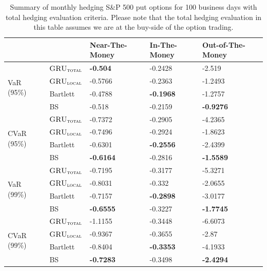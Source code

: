 \documentclass[letterpaper,12pt,titlepage,oneside,final]{book}
\numberwithin{equation}{section}
\theoremstyle{definition}
\newcommand{\modelT}{\textsc{GRU}_{\textsc{total}}}
\newcommand{\modelL}{\textsc{GRU}_{\textsc{local}}}
\begin{document}
\begin{table}[htp!]
	\centering
	\begin{tabular}{ll|l|l|l|}
		\cline{3-5}
		&          & Near-The-Money   & In-The-Money     & Out-of-The-Money  \\ \hline
		\multicolumn{1}{|l|}{\multirow{4}{*}{VaR (95\%)}}     & $\modelT$    &\textbf{-0.504}  &-0.2428 &-2.519           \\  
		\multicolumn{1}{|l|}{}                                & $\modelL$    &-0.5766 &-0.2363 &-1.2493  \\  
		\multicolumn{1}{|l|}{}                                & Bartlett 	 &-0.4788 &\textbf{-0.1968} &-1.2757           \\  
		\multicolumn{1}{|l|}{}                                & BS       	 &-0.518  &-0.2159 &\textbf{-0.9276}           \\ 
		\hline
		\multicolumn{1}{|l|}{\multirow{4}{*}{CVaR (95\%)}}    & $\modelT$    &-0.7372 &-0.2905 &-4.2365 \\  
		\multicolumn{1}{|l|}{}                                & $\modelL$    &-0.7496 &-0.2924 &-1.8623          \\  
		\multicolumn{1}{|l|}{}                                & Bartlett 	 &-0.6301 &\textbf{-0.2556} &-2.4399          \\  
		\multicolumn{1}{|l|}{}                                & BS       	 &\textbf{-0.6164} &-0.2816 &\textbf{-1.5589}          \\ 
		\hline
		\multicolumn{1}{|l|}{\multirow{4}{*}{VaR (99\%)}}     & $\modelT$   &-0.7195 &-0.3177 &-5.3271         \\  
		\multicolumn{1}{|l|}{}                                & $\modelL$   &-0.8031 &-0.332  &-2.0655
		                  \\  
		\multicolumn{1}{|l|}{}                                & Bartlett 	& -0.7157 &\textbf{-0.2898} &-3.0177\\  
		\multicolumn{1}{|l|}{}                                & BS       	&\textbf{-0.6555} &-0.3227 &\textbf{-1.7745}         \\ 
		\hline
		\multicolumn{1}{|l|}{\multirow{4}{*}{CVaR (99\%)}}    & $\modelT$   &-1.1155 &-0.3448 &-6.6073 \\  
		\multicolumn{1}{|l|}{}                                & $\modelL$   &-0.9367 &-0.3655 &-2.87          \\  
		\multicolumn{1}{|l|}{}                                & Bartlett 	&-0.8404 &\textbf{-0.3353} &-4.1933          \\  
		\multicolumn{1}{|l|}{}                                & BS       	&\textbf{-0.7283} &-0.3498 &\textbf{-2.4294}          \\ 
		\hline
	\end{tabular}
	\caption{Summary of monthly hedging S\&P 500 put options for 100 business days with total hedging evaluation criteria. Please note that the total hedging evaluation in this table assumes we are at the buy-side of the option trading.}
	\label{table:putTotalMBuy}
\end{table}
\end{document}
